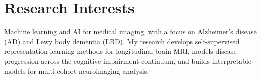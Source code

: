\documentclass[11pt]{article}
\begin{document}


\section{Research Interests}
Machine learning and AI for medical imaging, with a focus on Alzheimer's disease (AD) and
Lewy body dementia (LBD). My research develops self-supervised representation learning
methods for longitudinal brain MRI, models disease progression across the cognitive
impairment continuum, and builds interpretable models for multi-cohort neuroimaging analysis.









\end{document}
